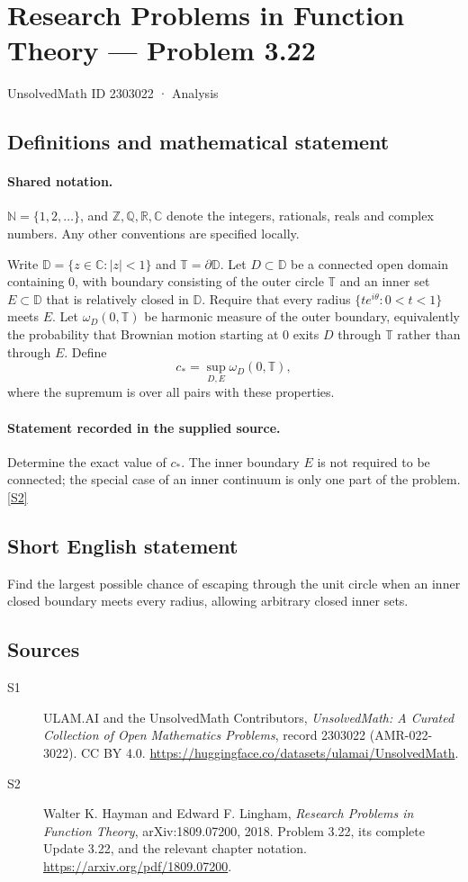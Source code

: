 \documentclass[11pt]{book}
\newcommand{\sref}[2]{\hyperlink{source:#1:#2}{[S#2]}}
\begin{document}
\setcounter{section}{2303021}
\section{Research Problems in Function Theory — Problem 3.22}\label{2303022}
{\small\sffamily UnsolvedMath ID 2303022 · Analysis}
\subsection{Definitions and mathematical statement}

\paragraph{Shared notation.}$\mathbb N=\{1,2,\ldots\}$, and $\mathbb Z,\mathbb Q,\mathbb R,\mathbb C$ denote the integers, rationals, reals and complex numbers. Any other conventions are specified locally.


Write $\mathbb D=\{z\in\mathbb C:|z|<1\}$ and $\mathbb T=\partial\mathbb D$. Let $D\subset\mathbb D$ be a connected open domain containing $0$, with boundary consisting of the outer circle $\mathbb T$ and an inner set $E\subset\mathbb D$ that is relatively closed in $\mathbb D$. Require that every radius $\{te^{i\theta}:0<t<1\}$ meets $E$. Let $\omega_D(0,\mathbb T)$ be harmonic measure of the outer boundary, equivalently the probability that Brownian motion starting at $0$ exits $D$ through $\mathbb T$ rather than through $E$. Define
\[c_* = \sup_{D,E}\omega_D(0,\mathbb T),\]
where the supremum is over all pairs with these properties.
\paragraph{Statement recorded in the supplied source.}
Determine the exact value of $c_*$. The inner boundary $E$ is not required to be connected; the special case of an inner continuum is only one part of the problem. \sref{2303022}{2}
\subsection{Short English statement}
Find the largest possible chance of escaping through the unit circle when an inner closed boundary meets every radius, allowing arbitrary closed inner sets.
\subsection{Sources}
\begin{description}
\item[\hypertarget{source:2303022:1}{S1}] ULAM.AI and the UnsolvedMath Contributors, \emph{UnsolvedMath: A Curated Collection of Open Mathematics Problems}, record 2303022 (AMR-022-3022). CC BY 4.0. \url{https://huggingface.co/datasets/ulamai/UnsolvedMath}.
\item[\hypertarget{source:2303022:2}{S2}] Walter K. Hayman and Edward F. Lingham, \emph{Research Problems in Function Theory}, arXiv:1809.07200, 2018. Problem 3.22, its complete Update 3.22, and the relevant chapter notation. \url{https://arxiv.org/pdf/1809.07200}.
\end{description}
\label{end:2303022}
\end{document}
